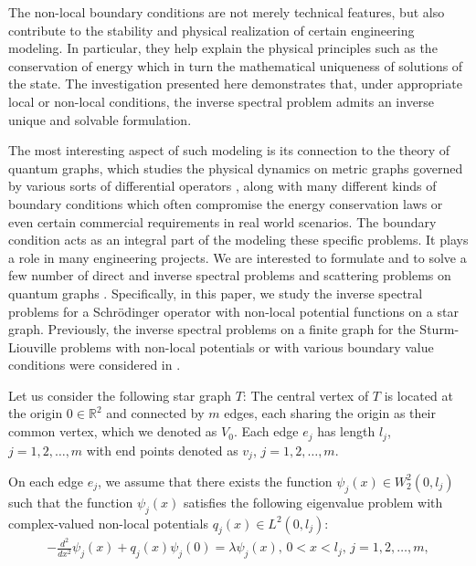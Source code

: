 \documentclass[10pt,a4paper]{article}
\theoremstyle{plain}
\theoremstyle{definition}
\theoremstyle{remark}
\numberwithin{equation}{section}
\begin{document}
The non-local boundary conditions are not merely technical features, but also contribute to the stability and physical realization of certain engineering modeling. In particular, they help explain the physical principles such as the conservation of energy which in turn the mathematical uniqueness of solutions of the state. The investigation presented here demonstrates that, under appropriate local or non-local conditions, the inverse spectral problem admits an inverse unique and solvable formulation.


\par
The most interesting aspect of such modeling is its connection to the theory of quantum graphs, which studies the physical dynamics on metric graphs governed by various sorts of differential operators \cite{Alb,Bon,Freiling,Gerasimenko,Kottos,Naimark}, along with many different kinds of boundary conditions which often compromise the energy conservation laws or even certain commercial requirements in real world scenarios. The boundary condition acts as an integral part of the modeling these specific problems. It plays a role in many engineering projects. We are interested to formulate and to solve a few number of direct and inverse spectral problems and scattering problems on quantum graphs \cite{Belishev,Carlson,Kostrykin,Kurasov,Kurasov2,Pivovarchik1,Yurko1,Yurko2}.
Specifically, in this paper, we study the inverse spectral problems for a Schr\"{o}dinger operator with non-local potential functions on a star graph. Previously, the inverse spectral problems on a finite graph for the Sturm-Liouville problems with non-local potentials or with various boundary value conditions were considered in \cite{Alb,Alb2,Bon,Nizhnik1,Nizhnik2,Pivovarchik1,Yang}.
\par
Let us consider the following star graph $T$: The central vertex of $T$ is located at the origin $0\in\mathbb{R}^{2}$ and connected by 
$m$ edges, each sharing the origin as their common vertex, which we denoted as $V_{0}$.  Each edge $e_{j}$ has length $l_{j}$, $j=1,2,\ldots,m$ with end points denoted as $v_{j}$, $j=1,2,\ldots,m$.
    \par
On each edge $e_{j}$, we assume that there exists the function $\psi_{j}(x)\in W_{2}^{2}(0,l_{j})$ such that the function $\psi_{j}(x)$ satisfies the following eigenvalue problem with complex-valued non-local potentials $q_{j}(x)\in L^{2}(0,l_{j})$:
\begin{eqnarray}\label{1.1}
-\frac{d^{2}}{dx^{2}}\psi_{j}(x)+q_{j}(x)\psi_{j}(0)=\lambda\psi_{j}(x),\,0<x<l_{j},\,j=1,2,\ldots,m,
\end{eqnarray}
\end{document}
